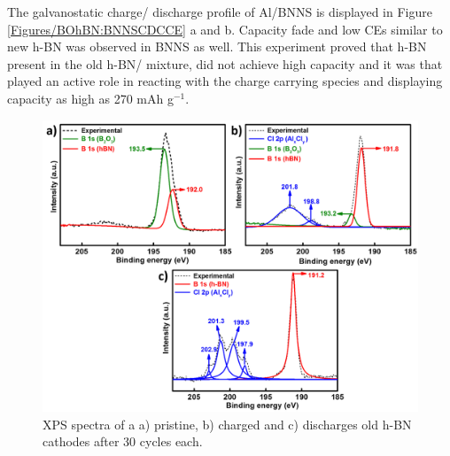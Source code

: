The galvanostatic charge/ discharge profile of Al/BNNS is displayed in Figure \ref{Figures/BOhBN:BNNSCDCCE} a and b. Capacity fade and low CEs similar to new h-BN was observed in BNNS as well. This experiment proved that h-BN present in the old h-BN/  mixture, did not achieve high capacity and it was  that played an active role in reacting with the charge carrying species and displaying capacity as high as 270 mAh g$^{-1}$.
\begin{figure}[tbh!]
\centering
\includegraphics[width=\textwidth]{Figures/BOhBN/oldhBNXPS}
\caption{XPS spectra of a a) pristine, b) charged and c) discharges old h-BN cathodes after 30 cycles each.}
\label{Figures/BOhBN:oldhBNXPS}
\end{figure}
